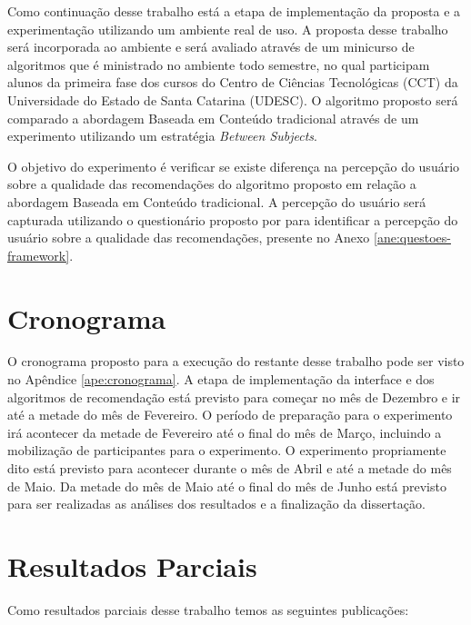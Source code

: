 Como continuação desse trabalho está a etapa de implementação da proposta e a experimentação utilizando um ambiente
real de uso. A proposta desse trabalho será incorporada ao ambiente \adaptweb e será avaliado através de um minicurso de
algoritmos que é ministrado no ambiente todo semestre, no qual participam alunos da primeira fase dos cursos
do Centro de Ciências Tecnológicas (CCT) da Universidade do Estado de Santa Catarina (UDESC). O algoritmo proposto será
comparado a abordagem Baseada em Conteúdo tradicional através de um experimento utilizando um estratégia \textit{Between Subjects}.

O objetivo do experimento é verificar se existe diferença na percepção do usuário sobre a qualidade das recomendações do
algoritmo proposto em relação a abordagem Baseada em Conteúdo tradicional. A percepção do usuário será capturada utilizando
o questionário proposto por  para identificar a percepção do usuário sobre a qualidade das recomendações,
presente no Anexo \ref{ane:questoes-framework}.

\section{Cronograma}

O cronograma proposto para a execução do restante desse trabalho pode ser visto no Apêndice \ref{ape:cronograma}. A etapa
de implementação da interface e dos algoritmos de recomendação está previsto para começar no mês de Dezembro e ir até
a metade do mês de Fevereiro. O período de preparação para o experimento irá acontecer da metade de Fevereiro até o
final do mês de Março, incluindo a mobilização de participantes para o experimento. O experimento propriamente dito está
previsto para acontecer durante o mês de Abril e até a metade do mês de Maio. Da metade do mês de Maio até o final do mês de Junho
está previsto para ser realizadas as análises dos resultados e a finalização da dissertação.

\section{Resultados Parciais}

Como resultados parciais desse trabalho temos as seguintes publicações:

